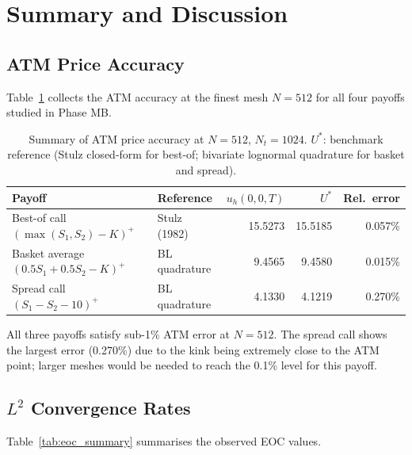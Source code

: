 \documentclass[11pt,a4paper]{article}
\newcommand{\ustar}{U^*}
\newcommand{\udpg}{u_h}
\begin{document}
\section{Summary and Discussion}
\label{sec:summary}

\subsection{ATM Price Accuracy}

Table~\ref{tab:summary} collects the ATM accuracy at the finest mesh $N=512$
for all four payoffs studied in Phase MB.

\begin{table}[htbp]
\centering
\caption{Summary of ATM price accuracy at $N=512$, $N_t=1024$.
$\ustar$: benchmark reference (Stulz closed-form for best-of; bivariate lognormal
quadrature for basket and spread).}
\label{tab:summary}
\begin{tabular}{@{}llrrr@{}}
\toprule
Payoff & Reference & $\udpg(0,0,T)$ & $\ustar$ & Rel.\ error \\
\midrule
Best-of call $(\max(S_1,S_2)-K)^+$
  & Stulz (1982)   & 15.5273 & 15.5185 & 0.057\% \\
Basket average $(0.5S_1+0.5S_2-K)^+$
  & BL quadrature  & 9.4565  & 9.4580  & 0.015\% \\
Spread call $(S_1-S_2-10)^+$
  & BL quadrature  & 4.1330  & 4.1219  & 0.270\% \\
\bottomrule
\end{tabular}
\end{table}

All three payoffs satisfy sub-1\% ATM error at $N=512$.
The spread call shows the largest error (0.270\%) due to the kink being
extremely close to the ATM point; larger meshes would be needed to reach
the 0.1\% level for this payoff.

\subsection{$L^2$ Convergence Rates}

Table~\ref{tab:eoc_summary} summarises the observed EOC values.
\end{document}
